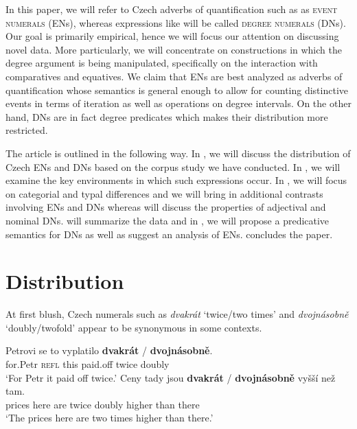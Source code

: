 \documentclass[output=paper,
modfonts,
hidelinks,
newtxmath
]{langscibook}
\begin{document}
\noindent In this paper, we will refer to Czech adverbs of quantification such as  as \textsc{event numerals} (ENs), whereas expressions like  will be called \textsc{degree numerals} (DNs). Our goal is primarily empirical, hence we will focus our attention on discussing novel data. More particularly, we will concentrate on constructions in which the degree argument is being manipulated, specifically on the interaction with comparatives and equatives. We claim that ENs are best analyzed as adverbs of quantification whose semantics is general enough to allow for counting distinctive events in terms of iteration as well as operations on degree intervals. On the other hand, DNs are in fact degree predicates which makes their distribution more restricted.

The article is outlined in the following way. In , we will discuss the distribution of Czech ENs and DNs based on the corpus study we have conducted. In , we will examine the key environments in which such expressions occur. In , we will focus on categorial and typal differences and we will bring in additional contrasts involving ENs and DNs whereas  will discuss the properties of adjectival and nominal DNs.  will summarize the data and in , we will propose a predicative semantics for DNs as well as suggest an analysis of ENs.  concludes the paper.

\section{Distribution}\label{distribution}

At first blush, Czech numerals such as \textit{dvakrát} `twice/two times' and \textit{dvojnásobně} `doubly/twofold' appear to be synonymous in some contexts.

\ea \ea \gll Petrovi se to vyplatilo \textbf{dvakrát} / \textbf{dvojnásobně}.\\
for.Petr \textsc{refl} this paid.off twice {} doubly\\
\glt `For Petr it paid off twice.'
\ex \gll Ceny tady jsou \textbf{dvakrát} / \textbf{dvojnásobně} vyšší než tam.\\
prices here are twice {} doubly higher than there\\
\glt `The prices here are two times higher than there.'
\z
\z
\end{document}
